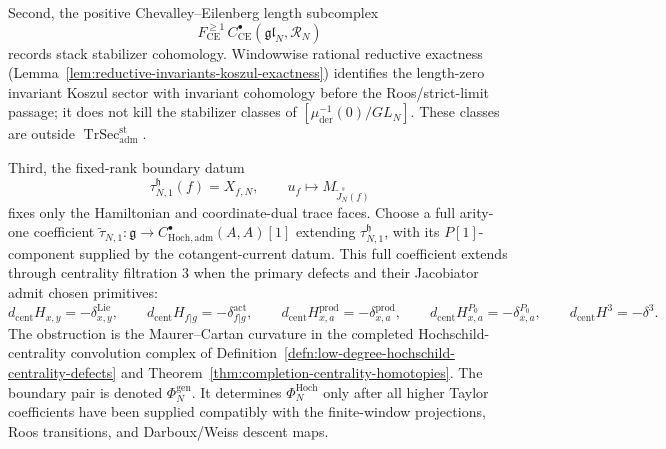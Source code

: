 \documentclass[11pt]{memoir}
\begin{document}
Second, the positive Chevalley--Eilenberg length subcomplex
\[
  F^{\ge1}_{\mathrm{CE}}\,
  C^\bullet_{\mathrm{CE}}(\mathfrak{gl}_N,\mathcal R_N)
\]
records stack stabilizer cohomology.  Windowwise rational reductive
exactness (Lemma~\ref{lem:reductive-invariants-koszul-exactness})
identifies the length-zero invariant Koszul sector with invariant
cohomology before the Roos/strict-limit passage; it does not kill the
stabilizer classes of
\([\mu^{-1}_{\mathrm{der}}(0)/GL_N]\).  These classes are outside
\(\operatorname{TrSec}^{\mathrm{st}}_{\mathrm{adm}}\).

Third, the fixed-rank boundary datum
\[
  \tau_{N,1}^{\mathfrak h}(f)=X_{f,N},\qquad
  u_f\longmapsto M_{\widetilde J_N^s(f)}
\]
fixes only the Hamiltonian and coordinate-dual trace faces.  Choose a
full arity-one coefficient
\(\widetilde\tau_{N,1}\colon\mathfrak g\to
C^\bullet_{\mathrm{Hoch},\mathrm{adm}}(A,A)[1]\) extending
\(\tau_{N,1}^{\mathfrak h}\), with its \(P[1]\)-component supplied by
the cotangent-current datum.  This full coefficient extends through
centrality filtration \(3\) when the primary defects and their
Jacobiator admit chosen primitives:
\[
  d_{\mathrm{cent}}H_{x,y}=-\delta^{\mathrm{Lie}}_{x,y},\qquad
  d_{\mathrm{cent}}H_{f|g}=-\delta^{\mathrm{act}}_{f|g},\qquad
  d_{\mathrm{cent}}H^{\mathrm{prod}}_{x,a}
    =-\delta^{\mathrm{prod}}_{x,a},\qquad
  d_{\mathrm{cent}}H^{P_0}_{x,a}=-\delta^{P_0}_{x,a},\qquad
  d_{\mathrm{cent}}H^3=-\delta^3.
\]
The obstruction is the Maurer--Cartan curvature in the completed
Hochschild-centrality convolution complex of
Definition~\ref{defn:low-degree-hochschild-centrality-defects} and
Theorem~\ref{thm:completion-centrality-homotopies}.  The boundary pair
is denoted \(\Phi_N^{\mathrm{gen}}\).  It determines
\(\Phi_N^{\mathrm{Hoch}}\) only after all higher Taylor coefficients
have been supplied compatibly with the finite-window projections,
Roos transitions, and Darboux/Weiss descent maps.
\end{document}
